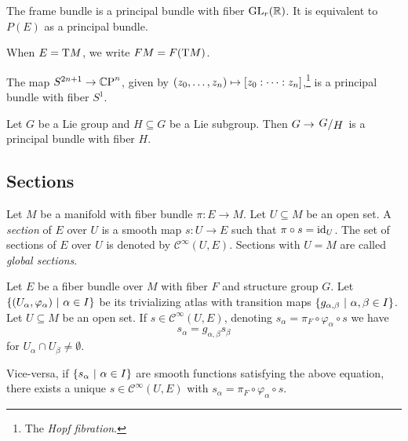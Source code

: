 \begin{trditev}
The frame bundle is a principal bundle with fiber $\operatorname{GL}_r(\mathbb{R})$. It
is equivalent to $P(E)$ as a principal bundle.
\end{trditev}


\begin{definicija}
When $E = \operatorname{T} \! M$, we write $FM = F(\operatorname{T} \! M)$.
\end{definicija}

\begin{zgled}
The map $S^{2n+1} \to \mathbb{C}\!\operatorname{P}^{n}$, given by
$\left(z_0, \dots, z_n\right) \mapsto [z_0 : \dots : z_n]$,\footnote{The
\emph{Hopf fibration}.} is a principal bundle
with fiber $S^1$.
\end{zgled}

\begin{zgled}
Let $G$ be a Lie group and $H \subseteq G$ be a Lie subgroup. Then
$G \to \kvoc{G}{H}$ is a principal bundle with fiber $H$.
\end{zgled}

\newpage

\subsection{Sections}

\begin{definicija}
Let $M$ be a manifold with fiber bundle $\pi \colon E \to M$. Let
$U \subseteq M$ be an open set. A \emph{section} of
$E$ over $U$ is a smooth map $s \colon U \to E$ such that
$\pi \circ s = \operatorname{id}_U$. The set of sections of $E$ over $U$ is
denoted by $\mathcal{C}^\infty(U, E)$. Sections with $U = M$ are
called \emph{global sections}.
\end{definicija}

\begin{trditev}
Let $E$ be a fiber bundle over $M$ with fiber $F$ and structure
group $G$. Let $\left\{(U_\alpha, \varphi_\alpha)~\middle\vert~\alpha \in I\right\}$ be
its trivializing atlas with transition maps
$\left\{g_{\alpha, \beta}~\middle\vert~\alpha, \beta \in I\right\}$. Let
$U \subseteq M$ be an open set. If
$s \in \mathcal{C}^\infty(U, E)$, denoting
$s_\alpha = \pi_F \circ \varphi_\alpha \circ s$ we have
\[
s_\alpha = g_{\alpha, \beta} s_\beta
\]
for $U_\alpha \cap U_\beta \ne \emptyset$.

Vice-versa, if $\left\{s_\alpha~\middle\vert~\alpha \in I\right\}$ are smooth functions
satisfying the above equation, there exists a unique
$s \in \mathcal{C}^\infty(U, E)$ with
$s_\alpha = \pi_F \circ \varphi_\alpha \circ s$.
\end{trditev}


